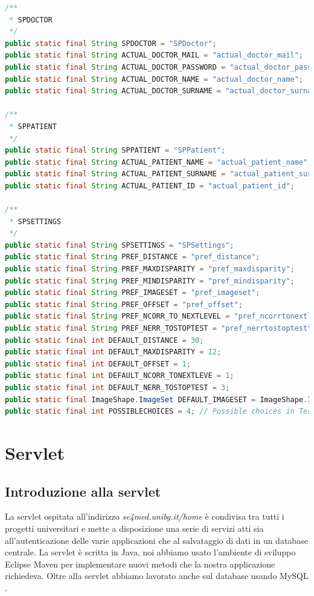 \documentclass[
	corpo=12pt,
	twoside,
 	evenboxes,
	tipotesi=triennale,
    	stile=classica,
   	 greek,
]{toptesi}
\begin{document}
\begin{lstlisting}[language=Java, label=lst:sharedpreferences, caption={Porzione di codice presa da DefaultValues.java}]
/**
 * SPDOCTOR
 */
public static final String SPDOCTOR = "SPDoctor";
public static final String ACTUAL_DOCTOR_MAIL = "actual_doctor_mail";
public static final String ACTUAL_DOCTOR_PASSWORD = "actual_doctor_password";
public static final String ACTUAL_DOCTOR_NAME = "actual_doctor_name";
public static final String ACTUAL_DOCTOR_SURNAME = "actual_doctor_surname";

/**
 * SPPATIENT
 */
public static final String SPPATIENT = "SPPatient";
public static final String ACTUAL_PATIENT_NAME = "actual_patient_name";
public static final String ACTUAL_PATIENT_SURNAME = "actual_patient_surname";
public static final String ACTUAL_PATIENT_ID = "actual_patient_id";

/**
 * SPSETTINGS
 */
public static final String SPSETTINGS = "SPSettings";
public static final String PREF_DISTANCE = "pref_distance";
public static final String PREF_MAXDISPARITY = "pref_maxdisparity";
public static final String PREF_MINDISPARITY = "pref_mindisparity";
public static final String PREF_IMAGESET = "pref_imageset";
public static final String PREF_OFFSET = "pref_offset";
public static final String PREF_NCORR_TO_NEXTLEVEL = "pref_ncorrtonextlevel";
public static final String PREF_NERR_TOSTOPTEST = "pref_nerrtostoptest";
public static final int DEFAULT_DISTANCE = 30;
public static final int DEFAULT_MAXDISPARITY = 12;
public static final int DEFAULT_OFFSET = 1;
public static final int DEFAULT_NCORR_TONEXTLEVE = 1;
public static final int DEFAULT_NERR_TOSTOPTEST = 3;
public static final ImageShape.ImageSet DEFAULT_IMAGESET = ImageShape.ImageSet.LANG;
public static final int POSSIBLECHOICES = 4; // Possible choices in Test
\end{lstlisting}

\chapter{Servlet}
\label{chap:servlet}

\section{Introduzione alla servlet}
\label{sec:introduzioneallaservlet}
La servlet ospitata all'indirizzo \textit{se4med.unibg.it/home} è condivisa tra tutti i progetti universitari e mette a disposizione una serie di servizi atti sia all'autenticazione delle varie applicazioni che al salvataggio di dati in un database centrale. La servlet è scritta in Java, noi abbiamo usato l'ambiente di sviluppo Eclipse Maven \cite{eclipse} per implementare nuovi metodi che la nostra applicazione richiedeva. Oltre alla servlet abbiamo lavorato anche sul database usando MySQL \cite{mysql}.\\
\end{document}
